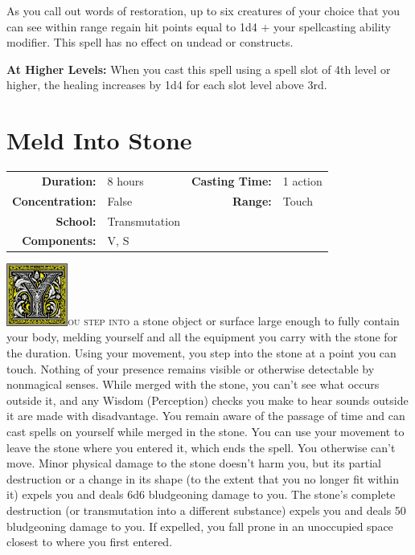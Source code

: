 \documentclass[12pt,showtrims]{memoir}
\begin{document}
\vspace{1\baselineskip}\noindent As you call out words of restoration, up to six creatures of your choice that you can see within range regain hit points equal to 1d4 + your spellcasting ability modifier. This spell has no effect on undead or constructs.

\vspace{8pt} \noindent\textbf{At Higher Levels:} When you cast this spell using a spell slot of 4th level or higher, the healing increases by 1d4 for each slot level above 3rd.
\newpage
\section*{Meld Into Stone}

{
\small\centering\vspace{-6pt}
\begin{tabular}{rlrl}
\toprule

\textbf{Duration:} & 8 hours &
\textbf{Casting Time:} & 1 action \\
\textbf{Concentration:} & False &
\textbf{Range:} & Touch \\
\textbf{School:} & Transmutation \\
\textbf{Components:} & \multicolumn{3}{p{0.7\textwidth}}{V, S}\\

\bottomrule
\end{tabular}
}

\vspace{1\baselineskip}\noindent 
\lettrine[lines=4]{\includegraphics[height=58pt]{initials/Y.png}}{ou step into} a stone object or surface large enough to fully contain your body, melding yourself and all the equipment you carry with the stone for the duration. Using your movement, you step into the stone at a point you can touch. Nothing of your presence remains visible or otherwise detectable by nonmagical senses. While merged with the stone, you can't see what occurs outside it, and any Wisdom (Perception) checks you make to hear sounds outside it are made with disadvantage. You remain aware of the passage of time and can cast spells on yourself while merged in the stone. You can use your movement to leave the stone where you entered it, which ends the spell. You otherwise can't move. Minor physical damage to the stone doesn't harm you, but its partial destruction or a change in its shape (to the extent that you no longer fit within it) expels you and deals 6d6 bludgeoning damage to you. The stone's complete destruction (or transmutation into a different substance) expels you and deals 50 bludgeoning damage to you. If expelled, you fall prone in an unoccupied space closest to where you first entered.
\end{document}
